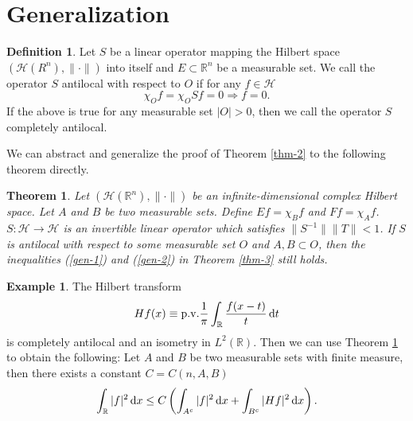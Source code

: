 \documentclass[12pt]{amsart}
\def\R {\mathbb{R}}
\def\d{{\,\rm d}}
\newtheorem{theorem}[proposition]{Theorem}
\theoremstyle{definition}
\newtheorem{definition}[proposition]{Definition}
\newtheorem{example}[proposition]{Example}
\numberwithin{equation}{section}
\begin{document}
\section{Generalization}
\begin{definition}
    Let $S$ be a linear operator mapping the Hilbert space $(\mathcal{H}(R^n),\|\cdot\|)$ into itself and $E\subset \R^n$ be a measurable set. We call the operator $S$ antilocal with respect to $O$  if for any $f\in\mathcal{H}$ 
    $$
        \chi_Of=\chi_O Sf=0\Rightarrow f=0.
    $$
    If the above is true for any measurable set $|O|>0$, then we call the operator $S$ completely antilocal.   
\end{definition}
We can abstract and generalize the proof of Theorem \ref{thm-2} to the following theorem directly.
\begin{theorem}\label{thm-4}
    Let $(\mathcal{H}(\R^n),\|\cdot\|)$ be an infinite-dimensional complex Hilbert space. Let $A$ and $B$ be two measurable sets. Define $Ef=\chi_B f$ and $Ff=\chi_A f$. $S:\mathcal{H}\to \mathcal{H}$ is an invertible linear operator which satisfies $\|S^{-1}\| \|T\|<1$. If $S$ is antilocal with respect to some measurable set $O$ and $A,B\subset O $, then the inequalities (\ref{gen-1}) and (\ref{gen-2}) in Theorem \ref{thm-3} still holds.            
\end{theorem}
\begin{example}
    The Hilbert transform 
    $$
        Hf(x)\equiv \mathrm{p.v.}\frac{1}{\pi}\int_{\R}\frac{f(x-t)}{t}\d t
    $$
      is completely antilocal\cite[p.~485]{HavJor} and an isometry in $L^2(\R)$. Then we can use Theorem \ref{thm-4} to obtain the following: Let $A$ and $B$ be two measurable sets with finite measure, then there exists a constant $C=C(n,A,B)$  
    $$
        \int_{\R}|f|^2\d x\le C\left(\int_{A^c} |f|^2\d x+\int_{B^c}|Hf|^2\d x\right).
    $$
    
\end{example}
\end{document}
